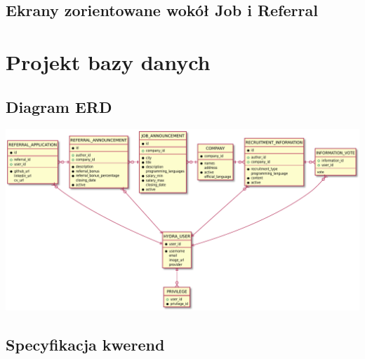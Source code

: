 \documentclass{scrreprt}
\begin{document}
\section{Ekrany zorientowane wokół Job i Referral}
\begin{center}
\end{center}


\chapter{Projekt bazy danych}

\section{Diagram ERD}
\includegraphics[width=\textwidth, keepaspectratio]{hydra_db_erd.pdf}

\section{Specyfikacja kwerend}
\end{document}
